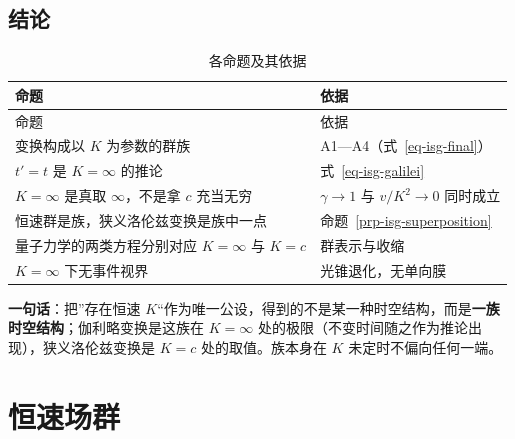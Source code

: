 \documentclass[
  chinese,
  a4paper,
  UTF8,
  12pt,
  oneside,
  openany]{ctexbook}
\theoremstyle{plain}
\theoremstyle{plain}
\theoremstyle{plain}
\theoremstyle{definition}
\theoremstyle{plain}
\theoremstyle{plain}
\theoremstyle{remark}
\begin{document}
\section{结论}\label{sec-isg-conclusion}

\begin{longtable}[]{@{}
  >{\raggedright\arraybackslash}p{}
  >{\raggedright\arraybackslash}p{}@{}}
\caption{各命题及其依据}\label{tbl-isg-conclusion}\tabularnewline
\toprule\noalign{}
\begin{minipage}[b]{\linewidth}\raggedright
命题
\end{minipage} & \begin{minipage}[b]{\linewidth}\raggedright
依据
\end{minipage} \\
\midrule\noalign{}
\endfirsthead
\toprule\noalign{}
\begin{minipage}[b]{\linewidth}\raggedright
命题
\end{minipage} & \begin{minipage}[b]{\linewidth}\raggedright
依据
\end{minipage} \\
\midrule\noalign{}
\endhead
\bottomrule\noalign{}
\endlastfoot
变换构成以 \(K\) 为参数的群族 & A1---A4（式~\ref{eq-isg-final}） \\
\(t'=t\) 是 \(K=\infty\) 的推论 & 式~\ref{eq-isg-galilei} \\
\(K=\infty\) 是真取 \(\infty\)，不是拿 \(c\) 充当无穷 & \(\gamma\to1\)
与 \(v/K^{2}\to0\) 同时成立 \\
恒速群是族，狭义洛伦兹变换是族中一点 &
命题~\ref{prp-isg-superposition} \\
量子力学的两类方程分别对应 \(K=\infty\) 与 \(K=c\) & 群表示与收缩 \\
\(K=\infty\) 下无事件视界 & 光锥退化，无单向膜 \\
\end{longtable}

\textbf{一句话}：把''存在恒速
\(K\)``作为唯一公设，得到的不是某一种时空结构，而是\textbf{一族时空结构}；伽利略变换是这族在
\(K=\infty\) 处的极限（不变时间随之作为推论出现），狭义洛伦兹变换是
\(K=c\) 处的取值。族本身在 \(K\) 未定时不偏向任何一端。


\chapter{恒速场群}\label{sec-invariant-speed-field-group}
\end{document}
